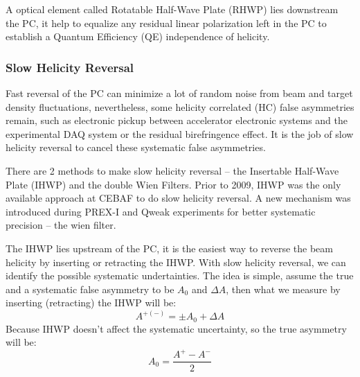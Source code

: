 A optical element called Rotatable Half-Wave Plate (RHWP) lies downstream the PC,
it help to equalize any residual linear polarization left in the PC to establish 
a Quantum Efficiency (QE) independence of helicity.

\subsubsection{Slow Helicity Reversal}
Fast reversal of the PC can minimize a lot of random noise from beam and target
density fluctuations, nevertheless, some helicity correlated (HC) false asymmetries
remain, such as electronic pickup between accelerator electronic systems and 
the experimental DAQ system or the residual birefringence effect. It is the 
job of slow helicity reversal to cancel these systematic false asymmetries.

There are 2 methods to make slow helicity reversal -- the Insertable Half-Wave Plate (IHWP) 
and the double Wien Filters. Prior to 2009, IHWP was the only available approach
at CEBAF to do slow helicity reversal. A new mechanism was introduced during 
PREX-I and Qweak experiments for better systematic precision -- the wien filter.

The IHWP lies upstream of the PC, it is the easiest way to reverse the beam 
helicity by inserting or retracting the IHWP. With slow helicity reversal, we 
can identify the possible systematic undertainties. The idea
is simple, assume the true and a systematic false asymmetry to be $A_0$ and $\Delta A$,
then what we measure by inserting (retracting) the IHWP will be:
\begin{equation}
    A^{+(-)} = \pm A_0  + \Delta A
\end{equation}
Because IHWP doesn't affect the systematic uncertainty, so the true asymmetry
will be:
\begin{equation}
    A_0 = \frac{A^+ - A^-}{2}
\end{equation}

